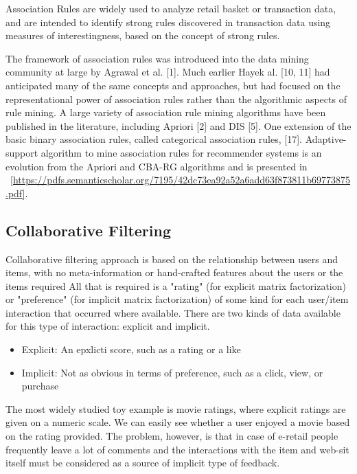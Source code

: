 \documentclass[12pt]{article}
\begin{document}
Association Rules are widely used to analyze retail basket or transaction data, and are intended to identify strong rules discovered in transaction data using measures of interestingness, based on the concept of strong rules.

The framework of association rules was introduced into the data mining community at large by Agrawal et al. [1]. Much earlier Hayek al. [10, 11] had anticipated many of the same concepts and approaches, but had focused on the representational power of association rules rather than the algorithmic aspects of rule mining. A large variety of association rule mining algorithms have been published in the literature, including Apriori [2] and DIS [5]. One extension of the basic binary association rules, called categorical association rules, [17].  Adaptive-support algorithm to mine association rules for recommender systems is an evolution from the Apriori and CBA-RG algorithms and is presented in ~\ref{https://pdfs.semanticscholar.org/7195/42dc73ea92a52a6add63f873811b69773875.pdf}.

\subsection{Collaborative Filtering}
Collaborative filtering approach is based on the relationship between users and items, with no meta-information or hand-crafted features about the users or the items required All that is required is a "rating" (for explicit matrix factorization) or "preference" (for implicit matrix factorization) of some kind for each user/item interaction that occurred where available. There are two kinds of data available for this type of interaction: explicit and implicit.

\begin{itemize}
	\item Explicit: An epxlicti score, such as a rating or a like
	\item Implicit: Not as obvious in terms of preference, such as a click, view, or purchase
\end{itemize}

The most widely studied toy example is movie ratings, where explicit ratings are given on a numeric scale. We can easily see whether a user enjoyed a movie based on the rating provided. The problem, however, is that in case of e-retail people frequently leave a lot of comments and the interactions with the item and web-sit itself must be considered as a source of implicit type of feedback.
\end{document}
